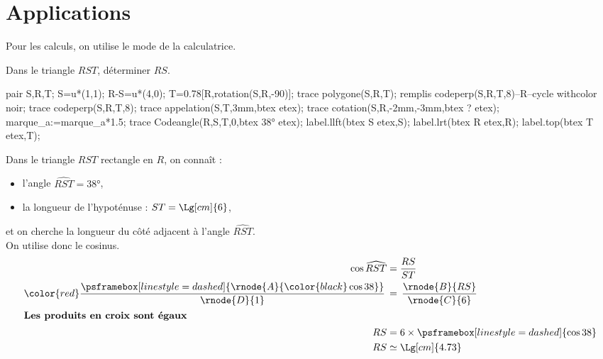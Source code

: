 \section{Applications}
\begin{remarque}
    Pour les calculs, on utilise le mode \fg{} de la calculatrice.
\end{remarque}

\begin{methode}
    \exercice    
    Dans le triangle $RST$, déterminer $RS$.\\
    \begin{Geometrie}[CoinHD={(6u,4.5u)}]        
        pair S,R,T;
        S=u*(1,1);
        R-S=u*(4,0);
        T=0.78[R,rotation(S,R,-90)];
        trace polygone(S,R,T);
        remplis codeperp(S,R,T,8)--R--cycle withcolor noir;
        trace codeperp(S,R,T,8);
        trace appelation(S,T,3mm,btex  etex);        
        trace cotation(S,R,-2mm,-3mm,btex ? etex);
        marque_a:=marque_a*1.5;
        trace Codeangle(R,S,T,0,btex \ang{38} etex);
        label.llft(btex S etex,S);
        label.lrt(btex R etex,R);
        label.top(btex T etex,T);
    \end{Geometrie}
    \correction
    Dans le triangle $RST$ rectangle en $R$, on connaît :
    \begin{itemize}
        \item l'angle $\widehat{RST}=\ang{38}$,
        \item la longueur de l'hypoténuse : $ST=\Lg[cm]{6}$,
    \end{itemize}
    et on cherche la longueur du côté adjacent à l'angle $\widehat{RST}$.\\
    On utilise donc le cosinus.
    \begin{align*}
        \cos\widehat{RST}&=\frac{RS}{ST}\\
        {\color{red}\frac{\psframebox[linestyle=dashed]{\rnode{A}{\color{black}\cos38}}}{\rnode{D}{1}}}\,&=\,\frac{\rnode{B}{RS}}{\rnode{C}{6}}\\    
        \intertext{\centering\bf Les produits en croix sont égaux}
        RS&=6\times\psframebox[linestyle=dashed]{\cos38}\\
        RS&\simeq\Lg[cm]{4.73}
    \end{align*}
    \vspace*{-10mm}
\end{methode}

